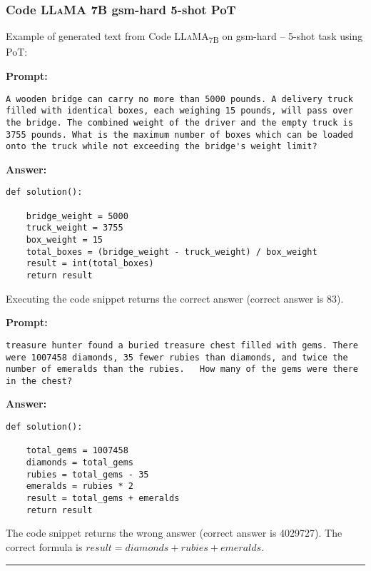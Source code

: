 	\subsubsection*{Code \textsc{LLaMA} 7B gsm-hard 5-shot PoT}
	\noindent Example of generated text from Code \textsc{LLaMA}\textsubscript{7B} on gsm-hard -- 5-shot task using PoT:
	\begin{displayquote}
		\textbf{Prompt:}
		\begin{Verbatim}[fontsize=\small,breaklines]
A wooden bridge can carry no more than 5000 pounds. A delivery truck filled with identical boxes, each weighing 15 pounds, will pass over the bridge. The combined weight of the driver and the empty truck is 3755 pounds. What is the maximum number of boxes which can be loaded onto the truck while not exceeding the bridge's weight limit?
	\end{Verbatim}
		\textbf{Answer:}
		\begin{Verbatim}[fontsize=\small,breaklines]
def solution():

    bridge_weight = 5000
    truck_weight = 3755
    box_weight = 15
    total_boxes = (bridge_weight - truck_weight) / box_weight
    result = int(total_boxes)
    return result
	\end{Verbatim}
	\end{displayquote}
	Executing the code snippet returns the correct answer (correct answer is 83).
	\begin{displayquote}
		\textbf{Prompt:}
		\begin{Verbatim}[fontsize=\small,breaklines]
 treasure hunter found a buried treasure chest filled with gems. There were 1007458 diamonds, 35 fewer rubies than diamonds, and twice the number of emeralds than the rubies.   How many of the gems were there in the chest?
	\end{Verbatim}
		\textbf{Answer:}
		\begin{Verbatim}[fontsize=\small,breaklines]
def solution():

    total_gems = 1007458
    diamonds = total_gems
    rubies = total_gems - 35
    emeralds = rubies * 2
    result = total_gems + emeralds
    return result
	\end{Verbatim}
	\end{displayquote}
	The code snippet returns the wrong answer (correct answer is 4029727).
	The correct formula is $result = diamonds + rubies + emeralds$.

	\noindent\rule{\textwidth}{0.4pt}


